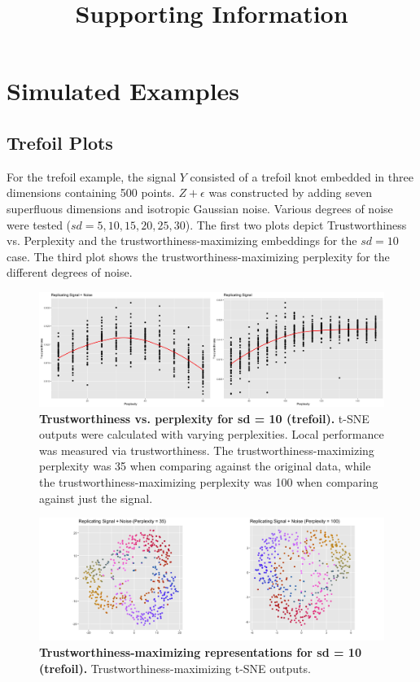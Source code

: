 \documentclass{article}
\title{Supporting Information}
\date{}
\begin{document}
\maketitle		

\renewcommand{\thefigure}{\Alph{figure}}

\section{Simulated Examples}
\subsection{Trefoil Plots}
For the trefoil example, the signal $Y$ consisted of a trefoil knot embedded in three dimensions containing 500 points. $Z + \epsilon$ was constructed by adding seven superfluous dimensions and isotropic Gaussian noise. Various degrees of noise were tested ($sd = 5, 10, 15, 20, 25, 30$). The first two plots depict Trustworthiness vs. Perplexity and the trustworthiness-maximizing embeddings for the $sd = 10$ case. The third plot shows the trustworthiness-maximizing perplexity for the different degrees of noise.

\begin{figure}[!h]
\centering
\includegraphics[scale=0.85]{Fig S1}
\caption{{\bf Trustworthiness vs. perplexity for sd = 10 (trefoil).}
t-SNE outputs were calculated with varying perplexities. Local performance was measured via trustworthiness. The trustworthiness-maximizing perplexity was 35 when comparing against the original data, while the trustworthiness-maximizing perplexity was 100 when comparing against just the signal.}
\end{figure}

\begin{figure}[H]
\centering
\includegraphics[scale=1.2]{Fig S2}
\caption{{\bf Trustworthiness-maximizing representations for sd = 10 (trefoil).}
Trustworthiness-maximizing t-SNE outputs.}
\end{figure}
\end{document}

